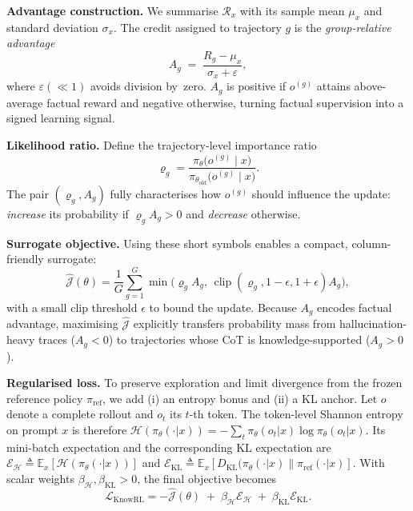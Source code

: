 \noindent\textbf{Advantage construction.}
We summarise $\mathcal{R}_x$ with its sample mean
$\mu_{x}$ and standard deviation $\sigma_{x}$. 
The credit assigned to trajectory $g$ is the
\emph{group-relative advantage}
\begin{equation}
\label{eq:adv}
A_{g}\;=\;\frac{R_{g}-\mu_{x}}{\sigma_{x}+\varepsilon},
\end{equation}
where $\varepsilon\!(\!\ll\!1)$ avoids division by~zero.
$A_{g}$ is positive if $o^{(g)}$ attains above-average factual reward and negative otherwise, turning factual supervision into a signed learning signal.

\noindent\textbf{Likelihood ratio.}
Define the trajectory-level importance ratio
\[
\varrho_{g}
=\frac{\pi_{\theta}\!\bigl(o^{(g)}\!\mid x\bigr)}
       {\pi_{\theta_{\mathrm{old}}}\!\bigl(o^{(g)}\!\mid x\bigr)}.
\]
The pair $(\varrho_{g},A_{g})$ fully characterises how $o^{(g)}$ should
influence the update: \emph{increase} its probability if
$\varrho_{g}A_{g}>0$ and \emph{decrease} otherwise.

\noindent\textbf{Surrogate objective.}
Using these short symbols enables a compact, column-friendly surrogate:
\begin{equation}
\label{eq:surrogate}
\hat{\mathcal{J}}(\theta)=
\frac{1}{G}\sum_{g=1}^{G}
\min\!\bigl(
      \varrho_{g}A_{g},\,
      \operatorname{clip}(\varrho_{g},1-\epsilon,1+\epsilon)A_{g}
     \bigr),
\end{equation}
with a small clip threshold $\epsilon$ to bound the update.
Because $A_{g}$ encodes factual advantage,
maximising $\hat{\mathcal{J}}$ explicitly transfers probability mass from hallucination-heavy traces ($A_{g}<0$) to trajectories whose CoT is knowledge-supported ($A_{g}>0$).


\noindent\textbf{Regularised loss.}\;
To preserve exploration and limit divergence from the frozen reference policy $\pi_{\text{ref}}$, we add (i) an entropy bonus and (ii) a KL anchor.  
Let $o$ denote a complete rollout and $o_t$ its $t$-th token.  
The token-level Shannon entropy on prompt $x$ is therefore
$\mathcal{H}(\pi_{\theta}(\cdot|x))
      =-\sum_{t}\pi_{\theta}(o_t|x)\log\pi_{\theta}(o_t|x)$.
Its mini-batch expectation and the corresponding KL expectation are
$\mathcal{E}_{\mathcal{H}}\triangleq\mathbb{E}_{x}[\mathcal{H}(\pi_{\theta}(\cdot|x))]$ and
$\mathcal{E}_{\mathrm{KL}}\triangleq\mathbb{E}_{x}[D_{\mathrm{KL}}(\pi_{\theta}(\cdot|x)\|\pi_{\text{ref}}(\cdot|x)]$.
With scalar weights $\beta_{\mathcal{H}},\beta_{\mathrm{KL}}>0$, the final objective becomes
\begin{equation}
\label{eq:loss}
\mathcal{L}_{\text{KnowRL}}
  = -\hat{\mathcal{J}}(\theta)
    \;+\;\beta_{\mathcal{H}}\mathcal{E}_{\mathcal{H}}
    \;+\;\beta_{\mathrm{KL}}\mathcal{E}_{\mathrm{KL}}.
\end{equation}


